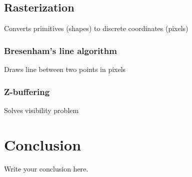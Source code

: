 \documentclass{article}
\begin{document}
\subsection{Rasterization}
Converts primitives (shapes) to discrete coordinates (pixels)

\subsubsection{Bresenham's line algorithm}
Draws line between two points in pixels

\subsubsection{Z-buffering}
Solves visibility problem
\section{Conclusion}
Write your conclusion here.
\end{document}
